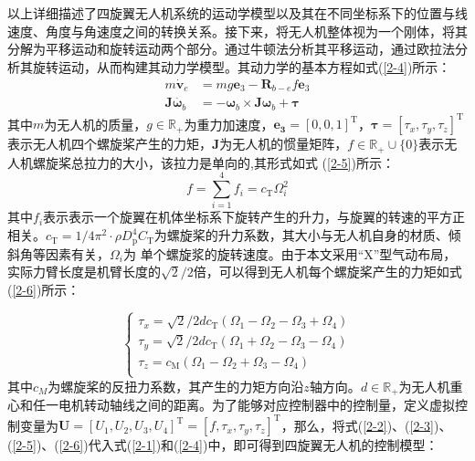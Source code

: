 \documentclass[lang=chs, degree=master, blindreview=true, winfonts=true]{yanputhesis}
\begin{document}
以上详细描述了四旋翼无人机系统的运动学模型以及其在不同坐标系下的位置与线速度、角度与角速度之间的转换关系。接下来，将无人机整体视为一个刚体，将其分解为平移运动和旋转运动两个部分。通过牛顿法分析其平移运动，通过欧拉法分析其旋转运动，从而构建其动力学模型。其动力学的基本方程如式(\ref{2-4})所示：
\begin{equation}
	\begin{aligned}
		m\dot{\boldsymbol{v}}_e&=mg\bm{e}_{3}-\boldsymbol{R}_{b-e}f\bm{e}_{3}\\
		\boldsymbol{J}\dot{\boldsymbol{\omega}_b}&=-\bm \omega_b \times \bm J \bm \omega_b+\boldsymbol{\tau}
	\end{aligned}\label{2-4}
\end{equation}
其中$m$为无人机的质量，$g\in\mathbb{R}_+$为重力加速度，$\bm{e_{3}}=\left[0,0,1\right]^\mathrm{T}$，$\boldsymbol{\tau}=\left[\tau_x,\tau_y,\tau_z\right]^\mathrm{T}$表示无人机四个螺旋桨产生的力矩，$\boldsymbol{J}$为无人机的惯量矩阵，$f\in\mathbb{R}_+\cup\{0\}$表示无人机螺旋桨总拉力的大小，该拉力是单向的,其形式如式 (\ref{2-5})所示：
\begin{equation}
	f=\sum_{i=1}^4f_i=c_\mathrm{T}\Omega_i^2
	\label{2-5}
\end{equation}
其中$f_i$表示表示一个旋翼在机体坐标系下旋转产生的升力，与旋翼的转速的平方正相关。$c_\mathrm{T}=1/4\pi^2\cdot\rho D_\mathrm{p}^4C_\mathrm{T}$为螺旋桨的升力系数，其大小与无人机自身的材质、倾斜角等因素有关，$\Omega_i$为
单个螺旋浆的旋转速度。由于本文采用“X”型气动布局，实际力臂长度是机臂长度的$\sqrt{2}/2$倍，可以得到无人机每个螺旋桨产生的力矩如式(\ref{2-6})所示：


\begin{equation}
	\left\{ \begin{array}{l}
		\tau_x={\sqrt{2}}/{2}dc_\mathrm{T}\left(\Omega_1-\Omega_2-\Omega_3+\Omega_4\right)\\
		\tau_y={\sqrt{2}}/{2}dc_\mathrm{T}\left(\Omega_1+\Omega_2-\Omega_3-\Omega_4\right)\\
		\tau_z=c_\mathrm{M}\left(\Omega_1-\Omega_2+\Omega_3-\Omega_4\right)\\
	\end{array} \right.
		\label{2-6}
\end{equation}
其中$c_M$为螺旋桨的反扭力系数，其产生的力矩方向沿$z$轴方向。$d\in\mathbb{R}_+$为无人机重心和任一电机转动轴线之间的距离。为了能够对应控制器中的控制量，定义虚拟控制变量为$\bm{U}=\left[U_1,U_2,U_3,U_4\right]^\mathrm{T}=\left[f,\tau_x,\tau_y,\tau_z\right]^\mathrm{T}$，那么，将式(\ref{2-2})、(\ref{2-3})、(\ref{2-5})、(\ref{2-6})代入式(\ref{2-1})和(\ref{2-4})中，即可得到四旋翼无人机的控制模型：
\end{document}
